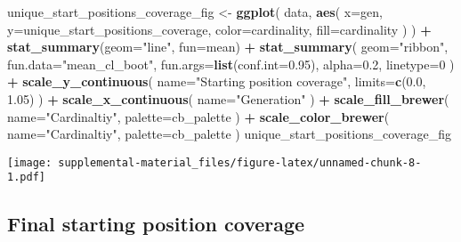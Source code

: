 \documentclass[]{book}
\newenvironment{Shaded}{\begin{snugshade}}{\end{snugshade}}
\newcommand{\DataTypeTok}[1]{\textcolor[rgb]{0.13,0.29,0.53}{#1}}
\newcommand{\DecValTok}[1]{\textcolor[rgb]{0.00,0.00,0.81}{#1}}
\newcommand{\FloatTok}[1]{\textcolor[rgb]{0.00,0.00,0.81}{#1}}
\newcommand{\KeywordTok}[1]{\textcolor[rgb]{0.13,0.29,0.53}{\textbf{#1}}}
\newcommand{\NormalTok}[1]{#1}
\newcommand{\OperatorTok}[1]{\textcolor[rgb]{0.81,0.36,0.00}{\textbf{#1}}}
\newcommand{\StringTok}[1]{\textcolor[rgb]{0.31,0.60,0.02}{#1}}
\begin{document}
\begin{Shaded}
\begin{Highlighting}[]
\NormalTok{unique_start_positions_coverage_fig <-}\StringTok{ }\KeywordTok{ggplot}\NormalTok{(}
\NormalTok{    data,}
    \KeywordTok{aes}\NormalTok{(}
      \DataTypeTok{x=}\NormalTok{gen,}
      \DataTypeTok{y=}\NormalTok{unique_start_positions_coverage,}
      \DataTypeTok{color=}\NormalTok{cardinality,}
      \DataTypeTok{fill=}\NormalTok{cardinality}
\NormalTok{    )}
\NormalTok{  ) }\OperatorTok{+}
\StringTok{  }\KeywordTok{stat_summary}\NormalTok{(}\DataTypeTok{geom=}\StringTok{"line"}\NormalTok{, }\DataTypeTok{fun=}\NormalTok{mean) }\OperatorTok{+}
\StringTok{  }\KeywordTok{stat_summary}\NormalTok{(}
    \DataTypeTok{geom=}\StringTok{"ribbon"}\NormalTok{,}
    \DataTypeTok{fun.data=}\StringTok{"mean_cl_boot"}\NormalTok{,}
    \DataTypeTok{fun.args=}\KeywordTok{list}\NormalTok{(}\DataTypeTok{conf.int=}\FloatTok{0.95}\NormalTok{),}
    \DataTypeTok{alpha=}\FloatTok{0.2}\NormalTok{,}
    \DataTypeTok{linetype=}\DecValTok{0}
\NormalTok{  ) }\OperatorTok{+}
\StringTok{  }\KeywordTok{scale_y_continuous}\NormalTok{(}
    \DataTypeTok{name=}\StringTok{"Starting position coverage"}\NormalTok{,}
    \DataTypeTok{limits=}\KeywordTok{c}\NormalTok{(}\FloatTok{0.0}\NormalTok{, }\FloatTok{1.05}\NormalTok{)}
\NormalTok{  ) }\OperatorTok{+}
\StringTok{  }\KeywordTok{scale_x_continuous}\NormalTok{(}
    \DataTypeTok{name=}\StringTok{"Generation"}
\NormalTok{  ) }\OperatorTok{+}
\StringTok{  }\KeywordTok{scale_fill_brewer}\NormalTok{(}
    \DataTypeTok{name=}\StringTok{"Cardinaltiy"}\NormalTok{,}
    \DataTypeTok{palette=}\NormalTok{cb_palette}
\NormalTok{  ) }\OperatorTok{+}
\StringTok{  }\KeywordTok{scale_color_brewer}\NormalTok{(}
    \DataTypeTok{name=}\StringTok{"Cardinaltiy"}\NormalTok{,}
    \DataTypeTok{palette=}\NormalTok{cb_palette}
\NormalTok{  )}
\NormalTok{unique_start_positions_coverage_fig}
\end{Highlighting}
\end{Shaded}

\texttt{[image: supplemental-material\_files/figure-latex/unnamed-chunk-8-1.pdf]}

\hypertarget{final-starting-position-coverage}{%
\subsection{Final starting position coverage}\label{final-starting-position-coverage}}
\end{document}

